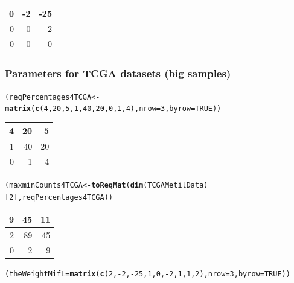 \documentclass[a4paper,10pt]{article}\usepackage[]{graphicx}\usepackage[]{color}
\makeatletter
\newcommand{\hlnum}[1]{\textcolor[rgb]{0.686,0.059,0.569}{#1}}%
\newcommand{\hlopt}[1]{\textcolor[rgb]{0,0,0}{#1}}%
\newcommand{\hlstd}[1]{\textcolor[rgb]{0.345,0.345,0.345}{#1}}%
\newcommand{\hlkwb}[1]{\textcolor[rgb]{0.69,0.353,0.396}{#1}}%
\newcommand{\hlkwc}[1]{\textcolor[rgb]{0.333,0.667,0.333}{#1}}%
\newcommand{\hlkwd}[1]{\textcolor[rgb]{0.737,0.353,0.396}{\textbf{#1}}}%
\newenvironment{kframe}{%
 \def\at@end@of@kframe{}%
 \ifinner\ifhmode%
  \def\at@end@of@kframe{\end{minipage}}%
  \begin{minipage}{\columnwidth}%
 \fi\fi%
 \def\FrameCommand##1{\hskip\@totalleftmargin \hskip-\fboxsep
 \colorbox{shadecolor}{##1}\hskip-\fboxsep
     \hskip-\linewidth \hskip-\@totalleftmargin \hskip\columnwidth}%
 \MakeFramed {\advance\hsize-\width
   \@totalleftmargin\z@ \linewidth\hsize
   \@setminipage}}%
 {\par\unskip\endMakeFramed%
 \at@end@of@kframe}
\newenvironment{knitrout}{}{} %
\makeatother
\begin{document}
\begin{knitrout}
\begin{tabular}{r|r|r}
\hline
0 & -2 & -25\\
\hline
0 & 0 & -2\\
\hline
0 & 0 & 0\\
\hline
\end{tabular}
\end{knitrout}

\subsubsection{Parameters for TCGA datasets (big samples)}
\begin{knitrout}
\color{fgcolor}\begin{kframe}
\begin{alltt}
\hlstd{(reqPercentages4TCGA} \hlkwb{<-} \hlkwd{matrix} \hlstd{(}\hlkwd{c}\hlstd{(}\hlnum{4}\hlstd{,} \hlnum{20}\hlstd{,} \hlnum{5}\hlstd{,} \hlnum{1}\hlstd{,} \hlnum{40}\hlstd{,} \hlnum{20}\hlstd{,} \hlnum{0}\hlstd{,} \hlnum{1}\hlstd{,} \hlnum{4}\hlstd{),} \hlkwc{nrow}\hlstd{=}\hlnum{3}\hlstd{,} \hlkwc{byrow}\hlstd{=}\hlnum{TRUE}\hlstd{))}
\end{alltt}
\end{kframe}


\begin{tabular}{r|r|r}
\hline
4 & 20 & 5\\
\hline
1 & 40 & 20\\
\hline
0 & 1 & 4\\
\hline
\end{tabular}\begin{kframe}\begin{alltt}
\hlstd{(maxminCounts4TCGA} \hlkwb{<-} \hlkwd{toReqMat}\hlstd{(}\hlkwd{dim}\hlstd{(TCGAMetilData)[}\hlnum{2}\hlstd{], reqPercentages4TCGA))}
\end{alltt}
\end{kframe}


\begin{tabular}{r|r|r}
\hline
9 & 45 & 11\\
\hline
2 & 89 & 45\\
\hline
0 & 2 & 9\\
\hline
\end{tabular}\begin{kframe}\begin{alltt}
\hlstd{(theWeightMifL}\hlkwb{=}\hlkwd{matrix} \hlstd{(}\hlkwd{c}\hlstd{(}\hlnum{2}\hlstd{,}\hlopt{-}\hlnum{2}\hlstd{,}\hlopt{-}\hlnum{25}\hlstd{,}\hlnum{1}\hlstd{,}\hlnum{0}\hlstd{,}\hlopt{-}\hlnum{2}\hlstd{,}\hlnum{1}\hlstd{,}\hlnum{1}\hlstd{,}\hlnum{2}\hlstd{),} \hlkwc{nrow}\hlstd{=}\hlnum{3}\hlstd{,} \hlkwc{byrow}\hlstd{=}\hlnum{TRUE}\hlstd{))}
\end{alltt}
\end{kframe}



\end{knitrout}
\end{document}
